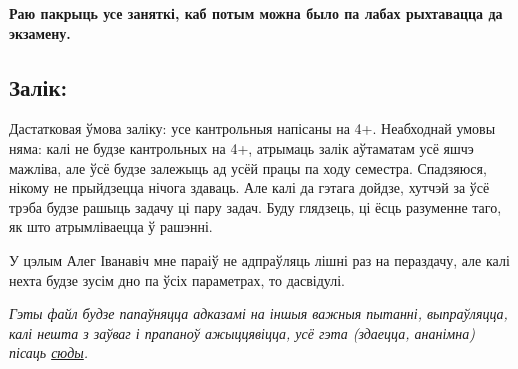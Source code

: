 	\textbf{Раю пакрыць усе заняткі, каб потым можна было па лабах рыхтавацца да экзамену.}
	
	\subsection{Залік:}

	Дастатковая ўмова заліку: усе кантрольныя напісаны на 4+. Неабходнай умовы няма: калі не будзе кантрольных на 4+, атрымаць залік аўтаматам усё яшчэ мажліва, але ўсё будзе залежыць ад усёй працы па ходу семестра. Спадзяюся, нікому не прыйдзецца нічога здаваць. Але калі да гэтага дойдзе, хутчэй за ўсё трэба будзе рашыць задачу ці пару задач. Буду глядзець, ці ёсць разуменне таго, як што атрымліваецца ў рашэнні. 

	У цэлым Алег Іванавіч мне параіў не адпраўляць лішні раз на пераздачу, але калі нехта будзе зусім дно па ўсіх параметрах, то дасвідулі.

	\textit{Гэты файл будзе папаўняцца адказамі на іншыя важныя пытанні, выпраўляцца, калі нешта з заўваг і прапаноў ажыццявіцца, усё гэта (здаецца, ананімна) пісаць \href{https://docs.google.com/document/d/1La38_lqT7PtdRVmlvKIVh_7rIWvHqPBFG7yrWFoKkFM/edit?usp=sharing}{сюды}.}
